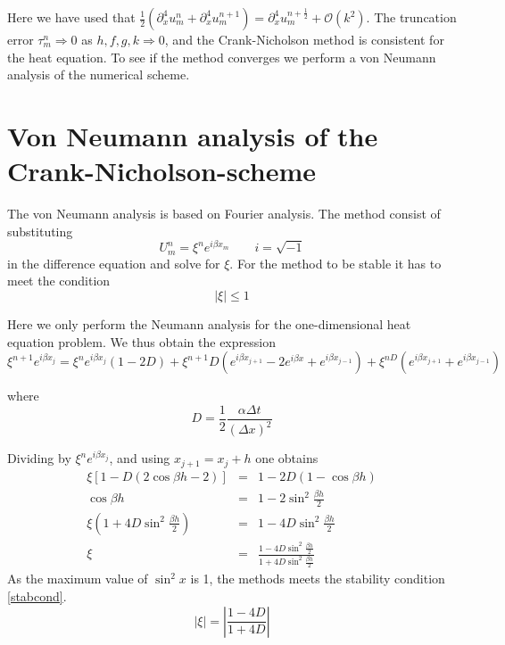 Here we have used that $\frac{1}{2}(\partial_x^4 u_m^n + \partial_x^4 u_m^{n+1}) = \partial_x^4 u_m^{n+\frac{1}{2}} + \mathcal{O} (k^2)$. 
The truncation error $\tau_m^n \Rightarrow 0$ as $h,f,g,k \Rightarrow 0$, and the Crank-Nicholson method is consistent for the heat equation. To see if the method converges we perform a von Neumann analysis of the numerical scheme.

\section{Von Neumann analysis of the Crank-Nicholson-scheme}

The von Neumann analysis is based on Fourier analysis. The method consist of substituting 
\begin{equation*}
	U_m^n=\xi^n e^{i \beta x_m} \quad \quad  i=\sqrt{-1}
\end{equation*}
in the difference equation and solve for $\xi$.
For the method to be stable it has to meet the condition
\begin{equation}
	\mid{\xi}\mid \leq 1
	\label{stabcond}
\end{equation}

Here we only perform the Neumann analysis for the one-dimensional heat equation problem. We thus obtain the expression
\begin{equation*}
\xi^{n+1} e^{i\beta x_{j}} = \xi^{n} e^{i\beta x_j}\left(1-2D\right) + \xi^{n+1}D\left(e^{i\beta x_{j+1}} - 2e^{i\beta  x} + e^{i\beta x_{j-1}}\right) + \xi^{nD}\left(e^{i\beta x_{j+1}} + e^{i\beta x_{j-1}}\right)
\end{equation*}

where
\begin{equation*}
D = \frac{1}{2}\frac{\alpha\Delta t}{(\Delta x)^2}
\label{eq:crank-D}
\end{equation*}

Dividing  by $\xi^ne^{i\beta x_j}$, and using $x_{j+1} = x_j + h$ one obtains    %
\begin{eqnarray*}
\xi\left[1-D\left(2\cos{\beta h} - 2\right)\right] &=& 1 - 2D\left(1-\cos{\beta h}\right) \\
\cos{\beta h} &=& 1-2\sin^2{\frac{\beta h}{2}} \\
\xi\left(1+4D\sin^{2}{\frac{\beta h}{2}}\right) &=& 1 - 4D\sin^2{\frac{\beta h}{2}} \\
\xi &=& \frac{1-4D\sin^2{\frac{\beta h}{2}}}{1+4D\sin^2{\frac{\beta h}{2}}}
\end{eqnarray*}
As the maximum value of $\sin^2{x}$ is 1, the methods meets the stability condition \ref{stabcond}.
\begin{equation}
|\xi | = \left|\frac{1-4D}{1+4D}\right|
\end{equation}

